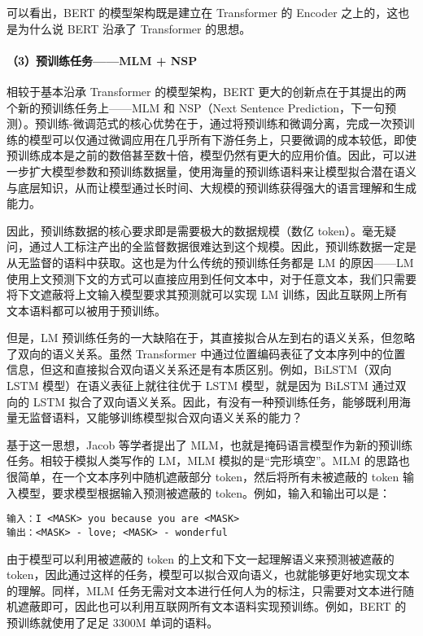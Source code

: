 \documentclass[
]{article}
\begin{document}
可以看出，BERT 的模型架构既是建立在 Transformer 的 Encoder
之上的，这也是为什么说 BERT 沿承了 Transformer 的思想。

\paragraph{（3）预训练任务------MLM +
NSP}\label{ux9884ux8badux7ec3ux4efbux52a1mlm-nsp}

相较于基本沿承 Transformer 的模型架构，BERT
更大的创新点在于其提出的两个新的预训练任务上------MLM 和 NSP（Next
Sentence
Prediction，下一句预测）。预训练-微调范式的核心优势在于，通过将预训练和微调分离，完成一次预训练的模型可以仅通过微调应用在几乎所有下游任务上，只要微调的成本较低，即使预训练成本是之前的数倍甚至数十倍，模型仍然有更大的应用价值。因此，可以进一步扩大模型参数和预训练数据量，使用海量的预训练语料来让模型拟合潜在语义与底层知识，从而让模型通过长时间、大规模的预训练获得强大的语言理解和生成能力。

因此，预训练数据的核心要求即是需要极大的数据规模（数亿
token）。毫无疑问，通过人工标注产出的全监督数据很难达到这个规模。因此，预训练数据一定是从无监督的语料中获取。这也是为什么传统的预训练任务都是
LM 的原因------LM
使用上文预测下文的方式可以直接应用到任何文本中，对于任意文本，我们只需要将下文遮蔽将上文输入模型要求其预测就可以实现
LM 训练，因此互联网上所有文本语料都可以被用于预训练。

但是，LM
预训练任务的一大缺陷在于，其直接拟合从左到右的语义关系，但忽略了双向的语义关系。虽然
Transformer
中通过位置编码表征了文本序列中的位置信息，但这和直接拟合双向语义关系还是有本质区别。例如，BiLSTM（双向
LSTM 模型）在语义表征上就往往优于 LSTM 模型，就是因为 BiLSTM 通过双向的
LSTM
拟合了双向语义关系。因此，有没有一种预训练任务，能够既利用海量无监督语料，又能够训练模型拟合双向语义关系的能力？

基于这一思想，Jacob 等学者提出了
MLM，也就是掩码语言模型作为新的预训练任务。相较于模拟人类写作的 LM，MLM
模拟的是``完形填空''。MLM 的思路也很简单，在一个文本序列中随机遮蔽部分
token，然后将所有未被遮蔽的 token 输入模型，要求模型根据输入预测被遮蔽的
token。例如，输入和输出可以是：

\begin{verbatim}
输入：I <MASK> you because you are <MASK>
输出：<MASK> - love; <MASK> - wonderful
\end{verbatim}

由于模型可以利用被遮蔽的 token 的上文和下文一起理解语义来预测被遮蔽的
token，因此通过这样的任务，模型可以拟合双向语义，也就能够更好地实现文本的理解。同样，MLM
任务无需对文本进行任何人为的标注，只需要对文本进行随机遮蔽即可，因此也可以利用互联网所有文本语料实现预训练。例如，BERT
的预训练就使用了足足 3300M 单词的语料。
\end{document}
